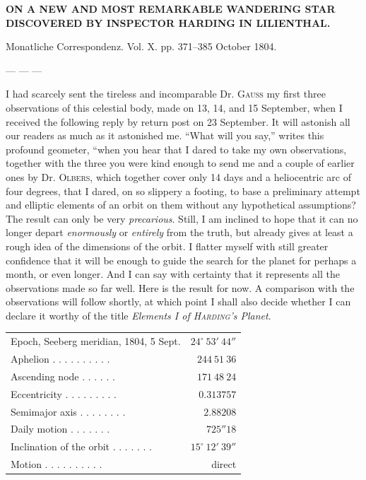 \clearpage
{}
\hypertarget{native-255-lower}{}
\begin{center}
\textbf{ON A NEW AND MOST REMARKABLE WANDERING STAR DISCOVERED BY INSPECTOR HARDING IN LILIENTHAL.}
\end{center}

\begin{center}
Monatliche Correspondenz. Vol. X. pp. 371–385 October 1804.
\end{center}

\begin{center}
— — —
\end{center}

I had scarcely sent the tireless and incomparable Dr. \textsc{Gauss} my first three observations of this celestial body, made on 13, 14, and 15 September, when I received the following reply by return post on 23 September. It will astonish all our readers as much as it astonished me. “What will you say,” writes this profound geometer, “when you hear that I dared to take my own observations, together with the three you were kind enough to send me and a couple of earlier ones by Dr. \textsc{Olbers}, which together cover only 14 days and a heliocentric arc of four degrees, that I dared, on so slippery a footing, to base a preliminary attempt and elliptic elements of an orbit on them without any hypothetical assumptions? The result can only be very \textit{precarious}. Still, I am inclined to hope that it can no longer depart \textit{enormously} or \textit{entirely} from the truth, but already gives at least a rough idea of the dimensions of the orbit. I flatter myself with still greater confidence that it will be enough to guide the search for the planet for perhaps a month, or even longer. And I can say with certainty that it represents all the observations made so far well. Here is the result for now. A comparison with the observations will follow shortly, at which point I shall also decide whether I can declare it worthy of the title \textit{Elements I of \textsc{Harding}’s Planet}.

\begin{center}
\begingroup\fontsize{9}{11}\selectfont\setlength{\tabcolsep}{3pt}
\begin{tabular}{lr}
Epoch, Seeberg meridian, 1804, 5 Sept.  & $24^\circ\ 53'\ 44''$ \\
Aphelion . . . . . . . . . . & $244\ 51\ 36$ \\
Ascending node . . . . . . & $171\ 48\ 24$ \\
Eccentricity . . . . . . . . . & $0.313757$ \\
Semimajor axis . . . . . . . . & $2.88208$ \\
Daily motion . . . . . . . & $725''18$ \\
Inclination of the orbit . . . . . . . & $15^\circ\ 12'\ 39''$ \\
Motion . . . . . . . . . . & direct \\
\end{tabular}\endgroup
\end{center}

